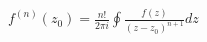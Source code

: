 \documentclass[preview]{standalone}
\begin{document}
\begin{center}
$f^{(n)}(z_0)=\frac{n!}{2\pi i}\oint\frac{f(z)}{(z-z_0)^{n+1}}dz$
\end{center}
\end{document}
